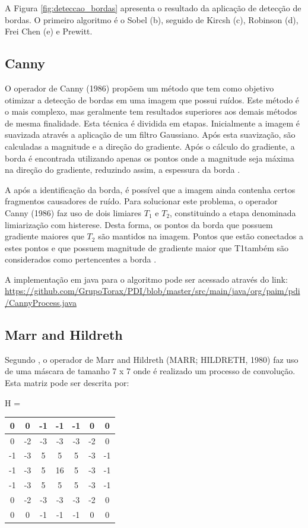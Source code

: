 \documentclass[
	12pt,				%
	oneside,			%
	a4paper,			%
	english,			%
	french,				%
	spanish,			%
	brazil,				%
	]{abntex2}
\begin{document}
A Figura \ref{fig:deteccao_bordas} apresenta o resultado da aplicação de detecção de bordas. O primeiro algoritmo é o Sobel (b), seguido de Kircsh (c), Robinson (d), Frei Chen (e) e Prewitt.

\subsection{Canny}

O operador de Canny (1986) propõem um método que tem como objetivo otimizar a detecção de bordas em uma imagem que possui ruídos. Este método é o mais complexo, mas geralmente tem resultados superiores aos demais métodos de mesma finalidade. Esta técnica é dividida em etapas. Inicialmente a imagem é suavizada através a aplicação de um filtro Gaussiano. Após esta suavização, são calculadas a magnitude e a direção do gradiente. Após o cálculo do gradiente, a borda é encontrada utilizando apenas os pontos onde a magnitude seja máxima na direção do gradiente, reduzindo assim, a espessura da borda \cite{pedriniSchwartz:2008}.

A após a identificação da borda, é possível que a imagem ainda contenha certos fragmentos causadores de ruído. Para solucionar este problema, o operador Canny (1986) faz uso de dois limiares \(T_1\) e \(T_2\), constituindo a etapa denominada limiarização com histerese. Desta forma, os pontos da borda que possuem gradiente maiores que \(T_2\) são mantidos na imagem. Pontos que estão conectados a estes pontos e que possuem magnitude de gradiente maior que T1também são considerados como pertencentes a borda \cite{pedriniSchwartz:2008}.

A implementação em java para o algoritmo pode ser acessado através do link:
\url{https://github.com/GrupoTorax/PDI/blob/master/src/main/java/org/paim/pdi/CannyProcess.java}

\subsection{Marr and Hildreth}
Segundo \citet{pedriniSchwartz:2008}, o operador de Marr and Hildreth (MARR; HILDRETH, 1980) faz uso de uma máscara de tamanho 7 x 7 onde é realizado um processo de convolução. Esta matriz pode ser descrita por:

\begin{center}
H = 
\begin{tabular}{|c|c|c|c|c|c|c|}
    \hline
     0 &  0 & -1 & -1 & -1 &  0 &  0            \\ \hline
     0 & -2 & -3 & -3 & -3 & -2 &  0            \\ \hline
    -1 & -3 &  5 &  5 &  5 & -3 & -1            \\ \hline
    -1 & -3 &  5 & 16 &  5 & -3 & -1            \\ \hline
    -1 & -3 &  5 &  5 &  5 & -3 & -1            \\ \hline
     0 & -2 & -3 & -3 & -3 & -2 &  0            \\ \hline
     0 &  0 & -1 & -1 & -1 &  0 &  0            \\ \hline     
\end{tabular}
\end{center}
\end{document}
